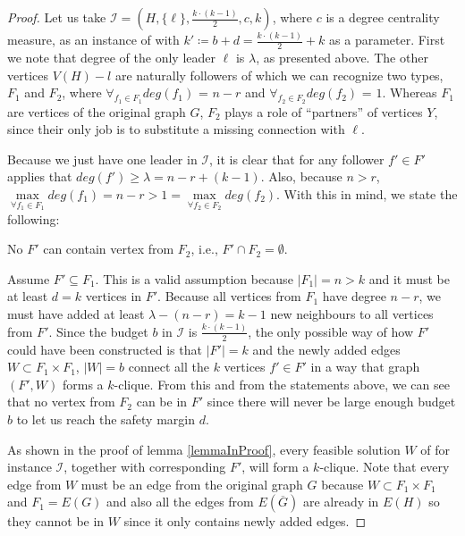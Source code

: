 \begin{proof}
    Let us take $ \mathcal{I} = (H, \{\ell\}, \frac{k\cdot(k-1)}{2}, c, k)$, where $c$ is a degree centrality measure,
    as an instance of \HLshort with $k' \coloneqq b + d = \frac{k\cdot(k-1)}{2} + k$ as a parameter.
    First we note that degree of the only leader $\ell$ is $\lambda$, as presented above.
    The other vertices $V(H) - l$ are naturally followers of which we can recognize two types, $F_1$ and $F_2$,
    where $\forall_{f_1 \in F_1} deg(f_1)$ = $n-r$ and $\forall_{f_2 \in F_2} deg(f_2)$ = $1$.
    Whereas $F_1$ are vertices of the original graph $G$,
    $F_2$ plays a role of ``partners'' of vertices $Y$, since their only job is to substitute a missing connection with $\ell$.

    Because we just have one leader in $\mathcal{I}$, it is clear that for any follower $f' \in F'$ applies that
    $deg(f') \geq \lambda = n - r + (k - 1)$.
    Also, because $n > r$, $\max\limits_{\forall f_1 \in F_1}deg(f_1) = n-r > 1 = \max\limits_{\forall f_2 \in F_2}deg(f_2)$.
    With this in mind, we state the following:

    \begin{lemma}\label{lemmaInProof}
        No $F'$ can contain vertex from $F_2$, i.e., $F' \cap F_2 = \emptyset$.
    \end{lemma}
    \begin{subproof}
        Assume $F' \subseteq F_1$. This is a valid assumption because $|F_1| = n > k$ and it must be at least $d = k$ vertices in $F'$.
        Because all vertices from $F_1$ have degree $n-r$, we must have added at least $\lambda - (n - r) = k - 1$ new neighbours to all vertices from $F'$.
        Since the budget $b$ in $\mathcal{I}$ is $\frac{k\cdot(k-1)}{2}$,
        the only possible way of how $F'$ could have been constructed is that $|F'|=k$ and the newly added edges $W \subset F_1 \times F_1$, $|W| = b$
        connect all the $k$ vertices $f' \in F'$ in a way that graph $(F', W)$ forms a $k$-clique.
        From this and from the statements above, we can see that no vertex from $F_2$ can be in $F'$
        since there will never be large enough budget $b$ to let us reach the safety margin $d$.
    \end{subproof}

    As shown in the proof of lemma \ref{lemmaInProof}, every feasible solution $W$ of \HLshort for instance $\mathcal{I}$, together with corresponding $F'$,
    will form a $k$-clique.
    Note that every edge from $W$ must be an edge from the original graph $G$ because $W \subset F_1 \times F_1$ and $F_1 = E(G)$
    and also all the edges from $E(\overline{G})$ are already in $E(H)$ so they cannot be in $W$ since it only contains newly added edges.


\end{proof}
